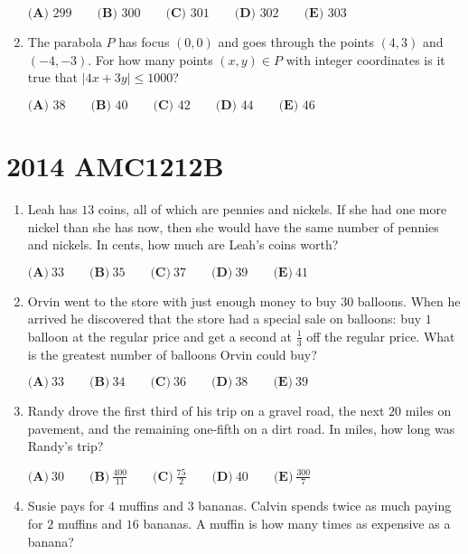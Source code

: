 \documentclass{article}
\begin{document}
\begin{enumerate}[label=\arabic*., itemsep=0.5em]
\(\textbf{(A) }299\qquad
\textbf{(B) }300\qquad
\textbf{(C) }301\qquad
\textbf{(D) }302\qquad
\textbf{(E) }303\qquad\)\par \vspace{0.5em}\item The parabola \(P\) has focus \((0,0)\) and goes through the points \((4,3)\) and \((-4,-3)\).  For how many points \((x,y)\in P\) with integer coordinates is it true that \(|4x+3y|\leq 1000\)?

\(\textbf{(A) }38\qquad
\textbf{(B) }40\qquad
\textbf{(C) }42\qquad
\textbf{(D) }44\qquad
\textbf{(E) }46\qquad\)\par \vspace{0.5em}\end{enumerate}\newpage\section*{2014 AMC1212B}\begin{enumerate}[label=\arabic*., itemsep=0.5em]\item Leah has \( 13 \) coins, all of which are pennies and nickels. If she had one more nickel than she has now, then she would have the same number of pennies and nickels. In cents, how much are Leah's coins worth?

\( \textbf{(A)}\ 33\qquad\textbf{(B)}\ 35\qquad\textbf{(C)}\ 37\qquad\textbf{(D)}\ 39\qquad\textbf{(E)}\ 41 \)\par \vspace{0.5em}\item Orvin went to the store with just enough money to buy \( 30 \) balloons. When he arrived he discovered that the store had a special sale on balloons: buy \( 1 \) balloon at the regular price and get a second at \( \frac{1}{3} \) off the regular price. What is the greatest number of balloons Orvin could buy?

\( \textbf{(A)}\ 33\qquad\textbf{(B)}\ 34\qquad\textbf{(C)}\ 36\qquad\textbf{(D)}\ 38\qquad\textbf{(E)}\ 39 \)\par \vspace{0.5em}\item Randy drove the first third of his trip on a gravel road, the next \( 20 \) miles on pavement, and the remaining one-fifth on a dirt road. In miles, how long was Randy's trip?

\( \textbf{(A)}\ 30\qquad\textbf{(B)}\ \frac{400}{11}\qquad\textbf{(C)}\ \frac{75}{2}\qquad\textbf{(D)}\ 40\qquad\textbf{(E)}\ \frac{300}{7} \)\par \vspace{0.5em}\item Susie pays for \( 4 \) muffins and \( 3 \) bananas. Calvin spends twice as much paying for \( 2 \) muffins and \( 16 \) bananas. A muffin is how many times as expensive as a banana?


\end{enumerate}
\end{document}
